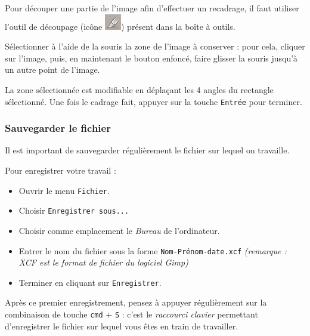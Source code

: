 Pour découper une partie de l'image afin d'effectuer un recadrage, il faut utiliser l'outil de découpage (icône \includegraphics[width=.04\textwidth]{./images/gimp/cutter}) présent dans la boîte à outils.

Sélectionner à l'aide de la souris la zone de l'image à conserver : pour cela, cliquer sur l'image, puis, en maintenant le bouton enfoncé, faire glisser la souris jusqu'à un autre point de l'image. 


La zone sélectionnée est modifiable en déplaçant les 4 angles du rectangle sélectionné. Une fois le cadrage fait, appuyer sur la touche \texttt{Entrée} pour terminer.


\subsubsection{Sauvegarder le fichier}

Il est important de sauvegarder régulièrement le fichier sur lequel on travaille.

Pour enregistrer votre travail :
\begin{itemize}
\item Ouvrir le menu \texttt{Fichier}.
\item Choisir \texttt{Enregistrer sous...}
\item Choisir comme emplacement le \emph{Bureau} de l'ordinateur.
\item Entrer le nom du fichier sous la forme \texttt{Nom-Prénom-date.xcf} \emph{(remarque : XCF est le format de fichier du logiciel Gimp)} 
\item Terminer en cliquant sur \texttt{Enregistrer}.   
\end{itemize}


Après ce premier enregistrement, pensez à appuyer régulièrement sur la combinaison de touche \texttt{cmd} + \texttt{S} : c'est le \emph{raccourci clavier} permettant d'enregistrer le fichier sur lequel vous êtes en train de travailler.




